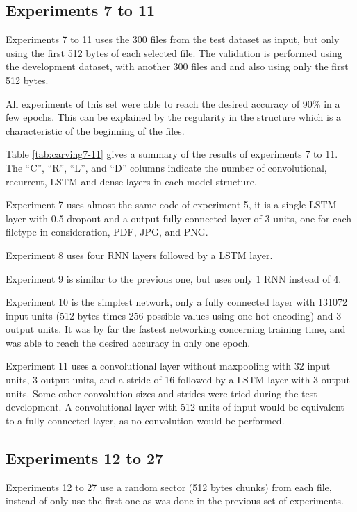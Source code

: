 \subsection{Experiments 7 to 11}
Experiments 7 to 11 uses the 300 files from the test dataset as input, but only using the first 512 bytes of each selected file. The validation is performed using the development dataset, with another 300 files and and also using only the first 512 bytes.

All experiments of this set were able to reach the desired accuracy of 90\% in a few epochs. This can be explained by the regularity in the structure which is a characteristic of the beginning of the files.

Table \ref{tab:carving7-11} gives a summary of the results of experiments 7 to 11. The ``C'', ``R'', ``L'', and ``D'' columns indicate the number of convolutional, recurrent, LSTM and dense layers in each model structure.


Experiment 7 uses almost the same code of experiment 5, it is a single LSTM layer with 0.5 dropout and a output fully connected layer of 3 units, one for each filetype in consideration, PDF, JPG, and PNG.

Experiment 8 uses four RNN layers followed by a LSTM layer.

Experiment 9 is similar to the previous one, but uses only 1 RNN instead of 4.

Experiment 10 is the simplest network, only a fully connected layer with 131072 input units (512 bytes times 256 possible values using one hot encoding) and 3 output units. It was by far the fastest networking concerning training time, and was able to reach the desired accuracy in only one epoch.

Experiment 11 uses a convolutional layer without maxpooling with 32 input units, 3 output units, and a stride of 16 followed by a LSTM layer with 3 output units. Some other convolution sizes and strides were tried during the test development. A convolutional layer with 512 units of input would be equivalent to a fully connected layer, as no convolution would be performed.

\subsection{Experiments 12 to 27}

Experiments 12 to 27 use a random sector (512 bytes chunks) from each file, instead of only use the first one as was done in the previous set of experiments.

